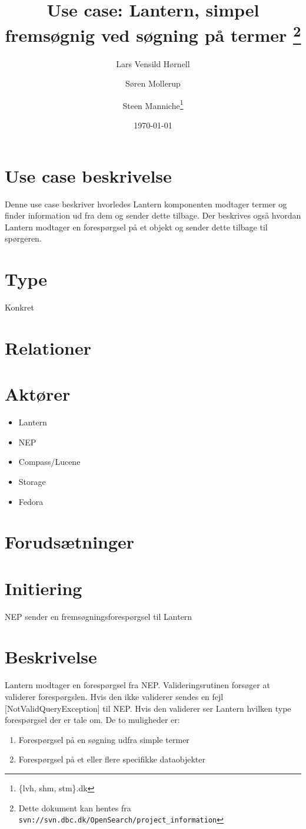 \documentclass{article}
\author{Lars Vensild Hørnell \and Søren Mollerup \and Steen
  Manniche\thanks{\{lvh, shm, stm\}\@dbc.dk}}
\date{\today}
\title{Use case: Lantern, simpel fremsøgnig ved søgning på termer
  \thanks{Dette dokument kan hentes fra \texttt{svn://svn.dbc.dk/OpenSearch/project\_information}}}
\begin{document}
\maketitle

\newpage

\tableofcontents

\section{Use case beskrivelse}
Denne use case beskriver hvorledes Lantern komponenten modtager
termer og finder information ud fra dem og sender dette tilbage. Der
beskrives også hvordan Lantern modtager en forespørgsel på et
objekt og sender dette tilbage til spørgeren. 

\section{Type}
Konkret

\section{Relationer}


\section{Aktører}

\begin{itemize}
\item Lantern
\item NEP
\item Compass/Lucene
\item Storage
\item Fedora
\end{itemize}

\section{Forudsætninger}

\section{Initiering}
NEP sender en fremsøgningsforespørgsel til Lantern

\section{Beskrivelse}
Lantern modtager en forespørgsel fra NEP. Valideringsrutinen
forsøger at validerer forespørgslen. Hvis den ikke validerer sendes en
fejl [NotValidQueryException] til NEP. Hvis den validerer ser Lantern hvilken type
forespørgsel der er tale om. De to muligheder er:
\begin{enumerate}
\item Forespørgsel på en søgning udfra simple termer
\item Forespørgsel på et eller flere specifikke dataobjekter
\end{enumerate}
\end{document}
